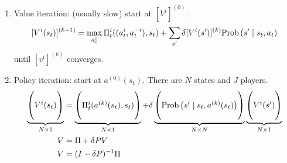 \documentclass[11pt]{elegantbook}
\begin{document}
\begin{enumerate}
    \item Value iteration: (usually slow) start at $[V^i]^{(0)}$.
    \begin{equation}
        \begin{aligned}
            [V^i(s_t)]^{(k+1)}=\max_{a^i_t}\Pi_t^i((a^i_t,a^{-i}_t),s_t)+\sum_{s'}\delta [V^i(s')]^{(k)}\textnormal{Prob}\left(s'\mid s_t,a_t\right)
        \end{aligned}
        \nonumber
    \end{equation}
    until $[v^i]^{(k)}$ converges.
    \item Policy iteration: start at $a^{(0)}(s_t)$. There are $N$ states and $J$ players.
    \begin{equation}
        \begin{aligned}
            \underbrace{\begin{pmatrix}
                \\
                V^i(s_t)\\
                \\
            \end{pmatrix}}_{N\times 1}
            &=
            \underbrace{\begin{pmatrix}
                \\
                \Pi_t^i(a^{(k)}(s_t),s_t)\\
                \\
            \end{pmatrix}}_{N\times 1}
            +\delta \underbrace{\begin{pmatrix}
                \\
                \textnormal{Prob}\left(s'\mid s_t,a^{(k)}(s_t)\right)\\
                \\
            \end{pmatrix}}_{N\times N}
            \underbrace{\begin{pmatrix}
                \\
                V^i(s')\\
                \\
            \end{pmatrix}}_{N\times 1}\\
            V&=\Pi+\delta P V\\
            V&=(I-\delta P)^{-1}\Pi
        \end{aligned}
        \nonumber
    \end{equation}

\end{enumerate}
\end{document}
